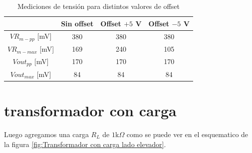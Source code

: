 \begin{table}[H]
    \centering
    
    \begin{tabular}{|c|c|c|c|}
        \hline
         & Sin offset & Offset $+5$ V & Offset $-5$ V \\ 
        \hline
        $VR_{m-pp}$ [mV]  & 380 & 380 & 380 \\
        \hline
        $VR_{m-max}$ [mV] & 169 & 240 & 105 \\
        \hline
        $Vout_{pp}$ [mV]  & 170 & 170 & 170 \\
        \hline
        $Vout_{max}$ [mV] & 84 & 84 & 84 \\
        \hline
    \end{tabular}
    
    \caption{Mediciones de tensión para distintos valores de offset}
    \label{tab:mediciones_offset}
\end{table}

\section{transformador con carga}
Luego agregamos una carga $R_L$ de $1$k$\Omega$ como se puede ver en el esquematico de la figura \ref{fig:Transformador con carga lado elevador}. 

